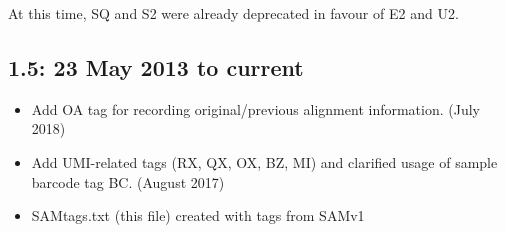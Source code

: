 \documentclass[10pt]{article}
\begin{document}
\begin{appendices}
At this time, SQ and S2 were already deprecated in favour of E2 and U2.

\subsection*{1.5: 23 May 2013 to current}
\begin{itemize}
\item Add OA tag for recording original/previous alignment information. (July 2018)
\item Add UMI-related tags (RX, QX, OX, BZ, MI) and clarified usage of sample barcode tag BC. (August 2017)
\item SAMtags.txt (this file) created with tags from SAMv1 
\end{itemize}

\end{appendices}
\end{document}
